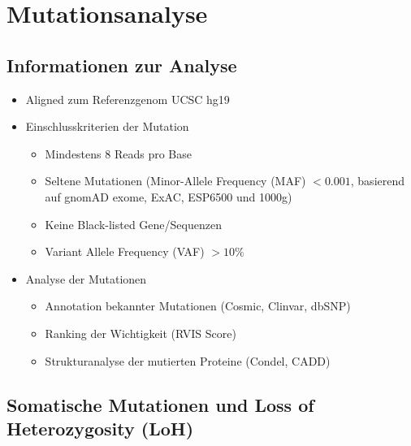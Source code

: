 \documentclass[woside,a4paper,12pt]{article}\usepackage[]{graphicx}\usepackage[]{color}
\begin{document}
\clearpage
\section{Mutationsanalyse}
\subsection{Informationen zur Analyse}

\begin{itemize}
\item Aligned zum Referenzgenom UCSC hg19
\item Einschlusskriterien der Mutation
  \begin{itemize}
    \item Mindestens 8 Reads pro Base
    \item Seltene Mutationen (Minor-Allele Frequency (MAF) $< 0.001$, basierend auf gnomAD exome, ExAC, ESP6500 und 1000g)
    \item Keine \grqq Black-listed\grqq{} Gene/Sequenzen
    \item Variant Allele Frequency (VAF) $> 10\%$
  \end{itemize}
  \item Analyse der Mutationen
  \begin{itemize}
  \item Annotation bekannter Mutationen (Cosmic, Clinvar, dbSNP)
  \item Ranking der Wichtigkeit (RVIS Score)
  \item Strukturanalyse der mutierten Proteine (Condel, CADD)
  \end{itemize}
\end{itemize}

\subsection{Somatische Mutationen und Loss of Heterozygosity (LoH)}
\end{document}
